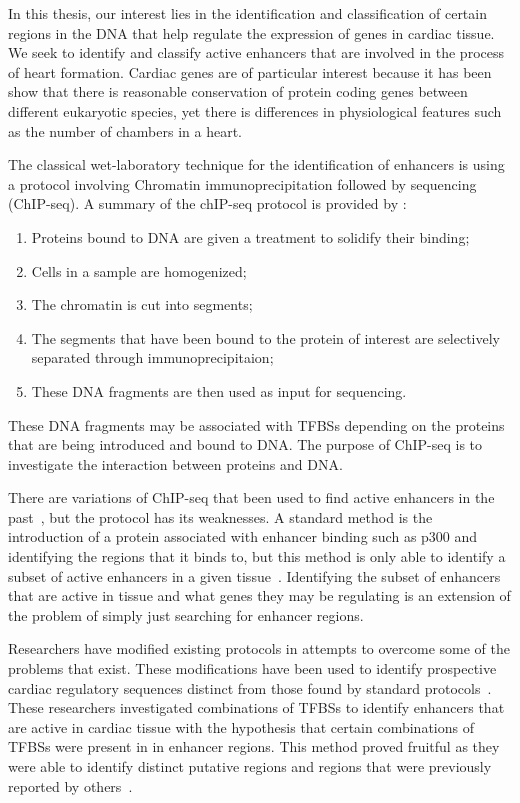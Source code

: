

In this thesis, our interest lies in the identification and classification of certain regions in the DNA that help regulate the expression of genes in cardiac tissue. We seek to identify and classify active enhancers that are involved in the process of heart formation. Cardiac genes are of particular interest because it has been show that there is reasonable conservation of protein coding genes between different eukaryotic species, yet there is differences in physiological features such as the number of chambers in a heart. %

The classical wet-laboratory technique for the identification of enhancers is using a protocol involving Chromatin immunoprecipitation followed by sequencing (ChIP-seq). A summary of the chIP-seq protocol is provided by \cite{collas2010current}:
    \begin{enumerate}
        \item Proteins bound to DNA are given a treatment to solidify their binding;
        \item Cells in a sample are homogenized;
        \item The chromatin is cut into segments;
        \item The segments that have been bound to the protein of interest are selectively separated through immunoprecipitaion;
        \item These DNA fragments are then used as input for sequencing.
    \end{enumerate}
These DNA fragments may be associated with TFBSs depending on the proteins that are being introduced and bound to DNA. The purpose of ChIP-seq is to investigate the interaction between proteins and DNA.

There are variations of ChIP-seq that been used to find active enhancers in the past~\cite{visel2009chip}, but the protocol has its weaknesses. A standard method is the introduction of a protein associated with enhancer binding such as p300 and identifying the regions that it binds to, but this method is only able to identify a subset of active enhancers in a given tissue~\cite{heintzman2007distinct}. Identifying the subset of enhancers that are active in tissue and what genes they may be regulating is an extension of the problem of simply just searching for enhancer regions.

Researchers have modified existing protocols in attempts to overcome some of the problems that exist. These modifications have been used to identify prospective cardiac regulatory sequences distinct from those found by standard protocols~\cite{he2011co}. These researchers investigated combinations of TFBSs to identify enhancers that are active in cardiac tissue with the hypothesis that certain combinations of TFBSs were present in in enhancer regions. This method proved fruitful as they were able to identify distinct putative regions and regions that were previously reported by others~\cite{blow2010chip}.%


